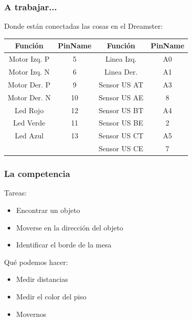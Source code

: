 \documentclass[compress]{beamer}
\begin{document}
\begin{frame}
\frametitle{A trabajar...}
Donde están conectadas las cosas en el Dreamster:
\begin{center}
\begin{tabular}{|c|c|c|c|}
\hline
\textbf{Función} & \textbf{PinName} & \textbf{Función} & \textbf{PinName}\\\hline
Motor Izq. P & 5 & Linea Izq. & A0\\\hline
Motor Izq. N & 6 & Linea Der. & A1\\\hline
Motor Der. P & 9 & Sensor US AT & A3\\\hline
Motor Der. N & 10 & Sensor US AE & 8\\\hline
Led Rojo & 12 & Sensor US BT & A4\\\hline
Led Verde & 11 & Sensor US BE & 2\\\hline
Led Azul & 13 & Sensor US CT & A5\\\hline
& & Sensor US CE & 7 \\\hline
\end{tabular}
\end{center}
\end{frame}

\begin{frame}
 \frametitle{La competencia}
Tareas:
\begin{itemize}
 \item Encontrar un objeto
 \item Moverse en la dirección del objeto
 \item Identificar el borde de la mesa
\end{itemize}
Qué podemos hacer:
\begin{itemize}
 \item Medir distancias
 \item Medir el color del piso
 \item Movernos
\end{itemize}
\end{frame}
\end{document}
